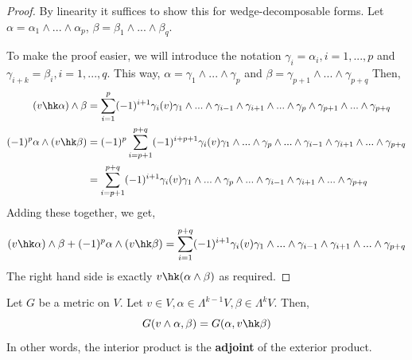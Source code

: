 \begin{proof}
    By linearity it suffices to show this for wedge-decomposable forms. Let $\alpha = \alpha_1\wedge...\wedge\alpha_p$, $\beta = \beta_1\wedge...\wedge\beta_q$. 

    To make the proof easier, we will introduce the notation $\gamma_i = \alpha_{i},i=1,...,p$ and $\gamma_{i+k}=\beta_i,i=1,...,q$. This way, $\alpha = \gamma_1\wedge...\wedge\gamma_p$ and $\beta = \gamma_{p+1}\wedge...\wedge\gamma_{p+q}$    
    Then,
    \begin{align*}
        (v\hk\alpha)\wedge\beta &= \sum_{i=1}^p (-1)^{i+1}\gamma_i(v)\gamma_1\wedge...\wedge\gamma_{i-1}\wedge\gamma_{i+1}\wedge...\wedge\gamma_{p}\wedge\gamma_{p+1}\wedge...\wedge\gamma_{p+q}\\
        (-1)^{p}\alpha\wedge(v\hk\beta)&= (-1)^p\sum_{i=p+1}^{p+q}(-1)^{i+p+1}\gamma_i(v)\gamma_1\wedge...\wedge\gamma_p\wedge...\wedge\gamma_{i-1}\wedge\gamma_{i+1}\wedge...\wedge\gamma_{p+q}\\
        &=\sum_{i=p+1}^{p+q}(-1)^{i+1}\gamma_i(v)\gamma_1\wedge...\wedge\gamma_p\wedge...\wedge\gamma_{i-1}\wedge\gamma_{i+1}\wedge...\wedge\gamma_{p+q}
    \end{align*}
    Adding these together, we get,
    \[(v\hk\alpha)\wedge\beta+(-1)^{p}\alpha\wedge(v\hk\beta)=\sum_{i=1}^{p+q}(-1)^{i+1}\gamma_i(v)\gamma_1\wedge...\wedge\gamma_{i-1}\wedge\gamma_{i+1}\wedge...\wedge\gamma_{p+q}\]
    The right hand side is exactly $v\hk(\alpha\wedge\beta)$ as required.
\end{proof}
\begin{thm}
Let $G$ be a metric on $V$.
    Let $v\in V,\alpha\in\Lambda^{k-1}V, \beta\in\Lambda^k V$. Then,
    \begin{equation}
        G(v\wedge \alpha,\beta) = G(\alpha,v\hk \beta)
    \end{equation}
    In other words, the interior product is the \textbf{adjoint} of the exterior product.
\end{thm}
